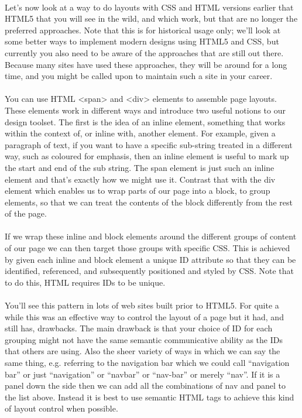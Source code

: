 \paragraph{} Let's now look at a way to do layouts with CSS and HTML versions earlier that HTML5 that you will see in the wild, and which work, but that are no longer the preferred approaches. Note that this is for historical usage only; we'll look at some better ways to implement modern designs using HTML5 and CSS, but currently you also need to be aware of the approaches that are still out there. Because many sites have used these approaches, they will be around for a long time, and you might be called upon to maintain such a site in your career.
\paragraph{} You can use HTML <span> and <div> elements to assemble page layouts. These elements work in different ways and introduce two useful notions to our design toolset. The first is the idea of an inline element, something that works within the context of, or inline with, another element. For example, given a paragraph of text, if you want to have a specific sub-string treated in a different way, such as coloured for emphasis, then an inline element is useful to mark up the start and end of the sub string. The span element is just such an inline element and that's exactly how we might use it. Contrast that with the div element which enables us to wrap parts of our page into a block, to group elements, so that we can treat the contents of the block differently from the rest of the page.
\paragraph{} If we wrap these inline and block elements around the different groups of content of our page we can then target those groups with specific CSS. This is achieved by given each inline and block element a unique ID attribute so that they can be identified, referenced, and subsequently positioned and styled by CSS. Note that to do this, HTML requires IDs to be unique.
\paragraph{} You'll see this pattern in lots of web sites built prior to HTML5. For quite a while this was an effective way to control the layout of a page but it had, and still has, drawbacks. The main drawback is that your choice of ID for each grouping might not have the same semantic communicative ability as the IDs that others are using. Also the sheer variety of ways in which we can say the same thing, e.g. referring to the navigation bar which we could call ``navigation bar'' or just ``navigation'' or ``navbar'' or ``nav-bar'' or merely ``nav''. If it is a panel down the side then we can add all the combinations of nav and panel to the list above. Instead it is best to use semantic HTML tags to achieve this kind of layout control when possible. 
